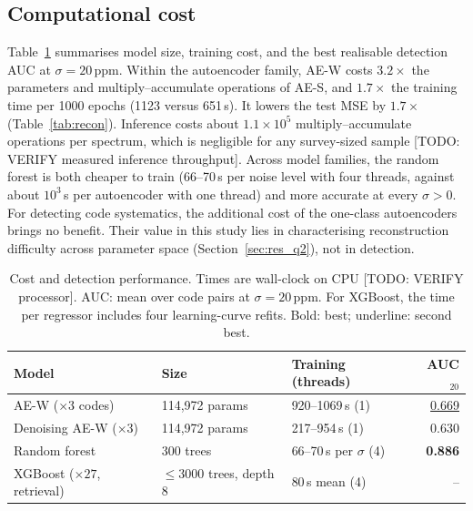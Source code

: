 \subsection{Computational cost}
\label{sec:res_cost}

Table~\ref{tab:cost} summarises model size, training cost, and the best realisable detection AUC at $\sigma=20\,\mathrm{ppm}$.
Within the autoencoder family, AE-W costs $3.2\times$ the parameters and multiply--accumulate operations of AE-S, and $1.7\times$ the training time per 1000 epochs (1123 versus 651\,s).
It lowers the test MSE by $1.7\times$ (Table~\ref{tab:recon}).
Inference costs about $1.1\times10^{5}$ multiply--accumulate operations per spectrum, which is negligible for any survey-sized sample [TODO: VERIFY measured inference throughput].
Across model families, the random forest is both cheaper to train (66--70\,s per noise level with four threads, against about $10^3$\,s per autoencoder with one thread) and more accurate at every $\sigma>0$.
For detecting code systematics, the additional cost of the one-class autoencoders brings no benefit.
Their value in this study lies in characterising reconstruction difficulty across parameter space (Section~\ref{sec:res_q2}), not in detection.

\begin{table}[t]
  \centering
  \caption{Cost and detection performance. Times are wall-clock on CPU [TODO: VERIFY processor]. AUC: mean over code pairs at $\sigma=20$\,ppm. For XGBoost, the time per regressor includes four learning-curve refits. Bold: best; underline: second best.}
  \label{tab:cost}
  \begin{tabular}{lllr}
    \toprule
    Model & Size & Training (threads) & AUC$_{20}$ \\
    \midrule
    AE-W ($\times3$ codes)          & 114{,}972 params  & 920--1069\,s (1)              & \underline{0.669} \\
    Denoising AE-W ($\times3$)      & 114{,}972 params  & 217--954\,s (1)               & 0.630 \\
    Random forest                   & 300 trees         & 66--70\,s per $\sigma$ (4)    & \textbf{0.886} \\
    XGBoost ($\times27$, retrieval) & $\leq3000$ trees, depth 8 & 80\,s mean (4)        & -- \\
    \bottomrule
  \end{tabular}
\end{table}
